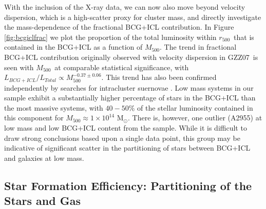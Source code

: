 \documentclass[preprint]{emulateapj}
\newcommand{\msun}{M$_\odot$}
\newcommand\rfive{$r_{500}$}
\newcommand\ptwo{GZZ07}
\newcommand\mfive{${M}_{500}$}
\begin{document}
With the inclusion of the X-ray data, we can now also move beyond
velocity dispersion, which is a high-scatter proxy for cluster mass,
and directly investigate the mass-dependence of the fractional BCG+ICL
contribution.  In Figure \ref{fig:bcgiclfrac} we plot the proportion
of the total luminosity within \rfive\ that is contained in the
BCG+ICL as a function of \mfive. %
The trend in fractional BCG+ICL contribution originally observed with
velocity dispersion in \ptwo\ is seen with \mfive\ at comparable
statistical significance, with $L_{BCG+ICL}/L_{Total}\propto
M_{500}^{-0.37\pm0.06}$.  This trend has also been confirmed
independently by searches for intracluster suernovae
\citep{mcgee2010,sand2011}.  Low mass systems in our sample exhibit a
substantially higher percentage of stars in the BCG+ICL than the most
massive systems, with $40-50$\% of the stellar luminosity contained in
this component for \mfive$\approx 1\times10^{14}$ \msun.  There is,
however, one outlier (A2955) at low mass and low BCG+ICL content from
the \citet{sanderson2013}
sample. While it is difficult to draw strong conclusions based upon a
single data point, this group may be indicative of significant scatter
in the partitioning of stars between BCG+ICL and galaxies at low mass.


\subsection{Star Formation Efficiency: Partitioning of the Stars and Gas}
\end{document}
